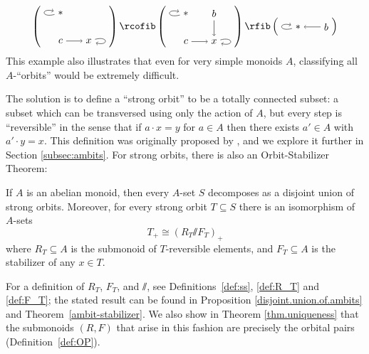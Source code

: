 \documentclass[11pt]{amsart}
\renewcommand{\ss}{\mathord{\sslash}}
\begin{document}
\[
  \left(\begin{tikzpicture}[baseline={([yshift=-0.5ex]current bounding box.center)}]
        \node (A) at (0,0) {$x$};
        \node (C) at (-1,0) {$c$};
        \draw[->] (C) -- (A);
        \draw (A) edge [loop right] (A);
        \node (pt) at (-1,1) {$*$};
        \draw (pt) edge [loop left] (pt);
    \end{tikzpicture}\right)
    \rcofib
    \left(\begin{tikzpicture}[baseline={([yshift=-0.5ex]current bounding box.center)}]
                \node (A) at (0,0) {$x$};
        \node (B) at (0,1) {$b$};
        \node (C) at (-1,0) {$c$};
        \draw[->] (B) -- (A);
        \draw[->] (C) -- (A);
        \draw (A) edge [loop right] (A);
        \node (pt) at (-1,1) {$*$};
        \draw (pt) edge [loop left] (pt);
    \end{tikzpicture}\right)
    \rfib
    \left(\begin{tikzpicture}[baseline={([yshift=-0.5ex]current bounding box.center)}]
        \node (B) at (0,1) {$b$};
        \node (pt) at (-1,1) {$*$};
        \draw (pt) edge [loop left] (pt);
        \draw[->] (B) -- (pt);
    \end{tikzpicture}\right)
\]
This example also illustrates that even for very simple monoids $A$, classifying all $A$-``orbits'' would be extremely difficult.

The solution is to define a ``strong orbit'' to be a totally connected subset: a subset which can be transversed using only the action of $A$, but every step is ``reversible'' in the sense that if $a \cdot x = y$ for $a\in A$ then there exists $a'\in A$ with $a'\cdot y = x$. This definition was originally proposed by \cite{burnside}, and we explore it further in Section \ref{subsec:ambits}.  For strong orbits, there is also an Orbit-Stabilizer Theorem:
\begin{maintheorem}
    If $A$ is an abelian monoid, then every $A$-set $S$ decomposes as a disjoint union of strong orbits.  Moreover, for every strong orbit $T \subseteq S$ there is an isomorphism of $A$-sets
    \[T_+ \cong (R_T \ss F_T)_+\]
    where $R_T \subseteq A$ is the submonoid of $T$-reversible elements, and $F_T\subseteq A$ is the stabilizer of any $x\in T$.
\end{maintheorem}
For a definition of $R_T$, $F_T$, and $\ss$, see Definitions~\ref{def:ss}, \ref{def:R_T} and \ref{def:F_T}; the stated result can be found in Proposition \ref{disjoint.union.of.ambits} and Theorem~\ref{ambit-stabilizer}. We also show in Theorem \ref{thm.uniqueness} that the submonoids $(R,F)$ that arise in this fashion are precisely the orbital pairs (Definition~\ref{def:OP}).
\end{document}

